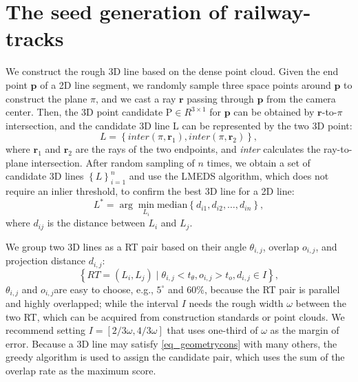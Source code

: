 \section{The seed generation of railway-tracks}
We construct the rough 3D line based on the dense point cloud.
Given the end point $\mathbf p$ of a 2D line segment,
we randomly sample three space points around $\mathbf p$ to construct the plane $\pi$,
and we cast a ray $\mathbf r$ passing through $\mathbf p$ from the camera center.
Then,
the 3D point candidate $\mathrm P \in R ^ {3\times1}$ for $\mathbf p$ can be obtained by $\mathbf r$-to-$\pi$ intersection,
and the candidate 3D line $\mathrm L$ can be represented by the two 3D point:
\begin{equation}
    L =\left\{\textit{inter} \left(\pi,\mathbf r_1\right),\textit{inter} \left(\pi,\mathbf r_2\right)  \right\},
\end{equation}
where $\mathbf r_1$ and $\mathbf r_2$ are the rays of the two endpoints,
and \textit{inter} calculates the ray-to-plane intersection.
After random sampling of $n$ times,
we obtain a set of candidate 3D lines $\left\{ L\right\}_{i=1}^n$ and use the LMEDS algorithm,
which does not require an inlier threshold, to confirm the best 3D line for a 2D line:
\begin{equation}
    L^* = \arg\min_{L_i} \text{median} \left\{ d_{i1}, d_{i2}, \dots, d_{in}\right\} ,
\end{equation}
where $d_{ij}$ is the distance between $L_i$ and $L_j$.  

We group two 3D lines as a RT pair based on their angle $\theta_{i,j}$,
overlap $o_{i,j}$,
and projection distance $d_{i,j}$:
\begin{equation}
   \left\{ RT= \left(L_i, L_j\right) \mid \theta_{i,j} < t_\theta, o_{i,j} > t_o, d_{i,j} \in I  \right\},
    \label{eq_geometrycons}
\end{equation}
$\theta_{i,j}$ and $o_{i,j}$are easy to choose,
e.g.,
$5^\circ$ and 60\%,
because the RT pair is parallel and highly overlapped;
while the interval $I$ needs the rough width $\omega$ between the two RT,
which can be acquired from construction standards or point clouds.
We recommend setting $I=\left[2/3\omega,4/3\omega\right]$ that uses one-third of $\omega$ as the margin of error.
Because a 3D line may satisfy \cref{eq_geometrycons} with many others,
the greedy algorithm is used to assign the candidate pair,
which uses the sum of the overlap rate as the maximum score.

